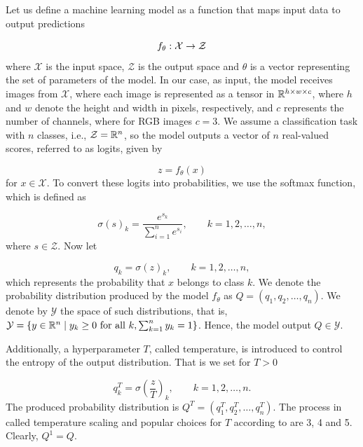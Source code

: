 Let us define a machine learning model as a function that maps input data to output predictions

\begin{equation*}
	f_{\theta}: \mathcal{X} \rightarrow \mathcal{Z}
\end{equation*}
where $\mathcal{X}$ is the input space, $\mathcal{Z}$ is the output space and $\theta$ is a vector representing the set of parameters of the model. In our case, as input, the model receives images from $\mathcal{X}$, where each image is represented as a tensor in $\mathbb{R}^{h \times w \times c}$, where $h$ and $w$ denote the height and width in pixels, respectively, and $c$ represents the number of channels, where for RGB images $c = 3$. We assume a classification task with $n$ classes, i.e., $\mathcal{Z} = \mathbb{R}^{n}$, so the model outputs a vector of $n$ real-valued scores, referred to as logits, given by

\begin{equation*}
	z = f_\theta(x)
\end{equation*}
for $x \in \mathcal{X}$. To convert these logits into probabilities, we use the softmax function, which is defined as

\begin{equation}
	\sigma(s)_k = \frac{e^{s_k}}{\sum_{i=1}^{n} e^{s_i}}, \qquad k = 1,2,\dots, n,
	\label{softmax}
\end{equation}
where $s \in \mathcal{Z}$. Now let

\begin{equation*}
	q_k = \sigma(z)_k, \qquad k = 1,2,\dots, n,
\end{equation*}
which represents the probability that $x$ belongs to class $k$. We denote the probability distribution produced by the model $f_\theta$ as $Q=\left(q_1,q_2,\dots,q_n\right)$. We denote by $\mathcal{Y}$ the space of such distributions, that is, $\mathcal{Y} = \{ y \in \mathbb{R}^n \mid y_k \geq 0 \text{ for all } k, \sum_{k=1}^{n} y_k = 1\}$. Hence, the model output $Q \in \mathcal{Y}$.

Additionally, a hyperparameter $T$, called temperature, is introduced to control the entropy of the output distribution. That is we set for $T>0$

\begin{equation}
	q_k^T = \sigma \left( \frac{z}{T} \right)_k, \qquad k = 1,2,\dots, n.
    \label{logits student}
\end{equation}
The produced probability distribution is $Q^T=\left(q^T_1,q^T_2,\dots,q^T_n\right)$. The process in called temperature scaling and popular choices for $T$ according to \cite{ChoHariharan2019} are 3, 4 and 5. Clearly, $Q^1 = Q$.

